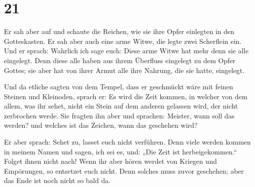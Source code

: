 \hypertarget{section-20}{%
\section{21}\label{section-20}}

 Er sah aber auf und schaute die Reichen, wie sie ihre
Opfer einlegten in den Gotteskasten.  Er sah aber auch
eine arme Witwe, die legte zwei Scherflein ein.  Und er
sprach: Wahrlich ich sage euch: Diese arme Witwe hat mehr denn sie alle
eingelegt.  Denn diese alle haben aus ihrem Überfluss
eingelegt zu dem Opfer Gottes; sie aber hat von ihrer Armut alle ihre
Nahrung, die sie hatte, eingelegt.

 Und da etliche sagten von dem Tempel, dass er geschmückt
wäre mit feinen Steinen und Kleinoden, sprach er:  Es wird
die Zeit kommen, in welcher von dem allem, was ihr sehet, nicht ein
Stein auf dem anderen gelassen wird, der nicht zerbrochen werde.
 Sie fragten ihn aber und sprachen: Meister, wann soll das
werden? und welches ist das Zeichen, wann das geschehen wird?

 Er aber sprach: Sehet zu, lasset euch nicht verführen.
Denn viele werden kommen in meinem Namen und sagen, ich sei es, und:
„Die Zeit ist herbeigekommen.`` Folget ihnen nicht nach! 
Wenn ihr aber hören werdet von Kriegen und Empörungen, so entsetzet euch
nicht. Denn solches muss zuvor geschehen; aber das Ende ist noch nicht
so bald da.

